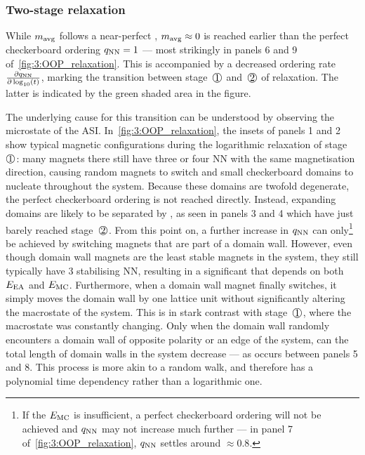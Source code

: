 \subsubsection{Two-stage relaxation}
While $m_\mathrm{avg}$ follows a near-perfect , $m_\mathrm{avg} \approx 0$ is reached earlier than the perfect checkerboard ordering $q_\mathrm{NN} = 1$ --- most strikingly in panels 6 and 9 of~\cref{fig:3:OOP_relaxation}.
This is accompanied by a decreased ordering rate $\frac{\partial q_\mathrm{NN}}{\partial \log_{10}(t)}$, marking the transition between stage~$\circled{1}$ and~$\circled{2}$ of relaxation.
The latter is indicated by the green shaded area in the figure. \par
The underlying cause for this transition can be understood by observing the microstate of the ASI.
In~\cref{fig:3:OOP_relaxation}, the insets of panels 1 and 2 show typical magnetic configurations during the logarithmic relaxation of stage~$\circled{1}$: many magnets there still have three or four NN with the same magnetisation direction, causing random magnets to switch and small checkerboard domains to nucleate throughout the system.
Because these domains are twofold degenerate, the perfect checkerboard ordering is not reached directly.
Instead, expanding domains are likely to be separated by , as seen in panels 3 and 4 which have just barely reached stage~$\circled{2}$.
From this point on, a further increase in $q_\mathrm{NN}$ can only\footnote{
	If the  $E_\mathrm{MC}$ is insufficient, a perfect checkerboard ordering will not be achieved and $q_\mathrm{NN}$ may not increase much further --- in panel 7 of~\cref{fig:3:OOP_relaxation}, $q_\mathrm{NN}$ settles around $\approx 0.8$.
} be achieved by switching magnets that are part of a domain wall.
However, even though domain wall magnets are the least stable magnets in the system, they still typically have 3 stabilising NN, resulting in a significant  that depends on both $E_\mathrm{EA}$ and $E_\mathrm{MC}$.
Furthermore, when a domain wall magnet finally switches, it simply moves the domain wall by one lattice unit without significantly altering the macrostate of the system.
This is in stark contrast with stage~$\circled{1}$, where the macrostate was constantly changing.
Only when the domain wall randomly encounters a domain wall of opposite polarity or an edge of the system, can the total length of domain walls in the system decrease --- as occurs between panels 5 and 8.
This process is more akin to a random walk, and therefore has a polynomial time dependency rather than a logarithmic one.
